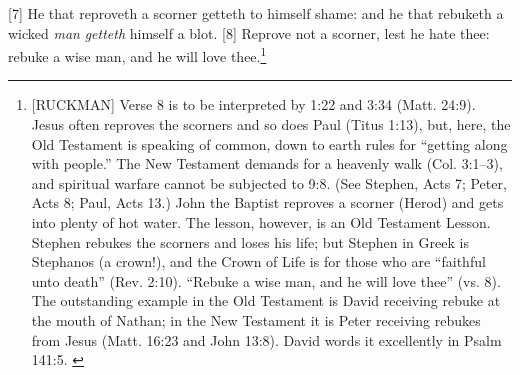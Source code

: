 [7] \textcolor[rgb]{0.00,0.00,1.00}{He that reproveth a scorner getteth to himself shame: and he that rebuketh a wicked \emph{man} \emph{getteth} himself a blot.}
[8] \textcolor[rgb]{0.00,0.00,1.00}{Reprove not a scorner, lest he hate thee: rebuke a wise man, and he will love thee.}\footnote{[RUCKMAN] Verse 8 is to be interpreted by 1:22 and 3:34 (Matt. 24:9). Jesus often reproves the scorners and so does Paul (Titus 1:13), but, here, the Old Testament is speaking of common, down to earth rules for “getting along with people.” The New Testament demands for a heavenly walk (Col. 3:1--3), and spiritual warfare cannot be subjected to 9:8. (See Stephen, Acts 7; Peter, Acts 8; Paul, Acts 13.) John the Baptist reproves a scorner (Herod) and gets into plenty of hot water. The lesson, however, is an Old Testament Lesson. Stephen rebukes the scorners and loses his life; but Stephen in Greek is Stephanos (a crown!), and the Crown of Life is for those who are “faithful unto death” (Rev. 2:10). “Rebuke a wise man, and he will love thee” (vs. 8). The outstanding example in the Old Testament is David receiving rebuke at the mouth of Nathan; in the New Testament it is Peter receiving rebukes from Jesus (Matt. 16:23 and John 13:8). David words it excellently in Psalm 141:5. \cite{Ruckman1972Proverbs}}
